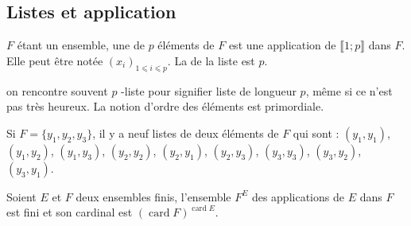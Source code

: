 \subsection{Listes et application}
\begin{definition}
[Liste] \(𝐹\) étant un ensemble, une  de \(𝑝\) éléments de \(𝐹\) est une application de
\(⟦1;𝑝⟧\) dans \(𝐹\). Elle peut être notée \((𝑥_{𝑖})_{1⩽𝑖⩽𝑝}\). La  de la liste
est \(𝑝\).
\end{definition}
\begin{remark}
  on rencontre souvent \(𝑝\) -liste pour signifier liste de longueur
\(𝑝\), même si ce n'est pas très heureux. La notion d'ordre des éléments est primordiale.
\end{remark}
\begin{example}
Si \(𝐹=\{𝑦_1,𝑦_2,𝑦_3\}\), il y a neuf listes de deux éléments de \(𝐹\) qui sont : \((𝑦_1,𝑦_1)\), \((𝑦_1,𝑦_2)\),
\((𝑦_1,𝑦_3)\), \((𝑦_2,𝑦_2)\), \((𝑦_2,𝑦_1)\), \((𝑦_2,𝑦_3)\), \((𝑦_3,𝑦_3)\), \((𝑦_3,𝑦_2)\), \((𝑦_3,𝑦_1)\).
\end{example}
\begin{theorem}
Soient \(𝐸\) et \(𝐹\) deux ensembles finis, l'ensemble \(𝐹^𝐸\) des applications de \(𝐸\) dans \(𝐹\) est fini et
son cardinal est \((\operatorname{card}𝐹)^{\operatorname{card}𝐸}\).
\end{theorem}
